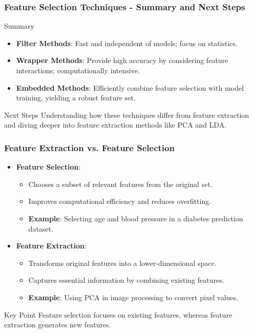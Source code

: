 \documentclass[aspectratio=169]{beamer}
\begin{document}
\begin{frame}[fragile]
    \frametitle{Feature Selection Techniques - Summary and Next Steps}
    \begin{block}{Summary}
        \begin{itemize}
            \item \textbf{Filter Methods}: Fast and independent of models; focus on statistics.
            \item \textbf{Wrapper Methods}: Provide high accuracy by considering feature interactions; computationally intensive.
            \item \textbf{Embedded Methods}: Efficiently combine feature selection with model training, yielding a robust feature set.
        \end{itemize}
    \end{block}
    \begin{block}{Next Steps}
        Understanding how these techniques differ from feature extraction and diving deeper into feature extraction methods like PCA and LDA.
    \end{block}
\end{frame}

\begin{frame}[fragile]
    \frametitle{Feature Extraction vs. Feature Selection}
    \begin{itemize}
        \item \textbf{Feature Selection}:
            \begin{itemize}
                \item Chooses a subset of relevant features from the original set.
                \item Improves computational efficiency and reduces overfitting.
                \item \textbf{Example}: Selecting age and blood pressure in a diabetes prediction dataset.
            \end{itemize}
        \item \textbf{Feature Extraction}:
            \begin{itemize}
                \item Transforms original features into a lower-dimensional space.
                \item Captures essential information by combining existing features.
                \item \textbf{Example}: Using PCA in image processing to convert pixel values.
            \end{itemize}
    \end{itemize}
    \begin{block}{Key Point}
        Feature selection focuses on existing features, whereas feature extraction generates new features.
    \end{block}
\end{frame}
\end{document}
